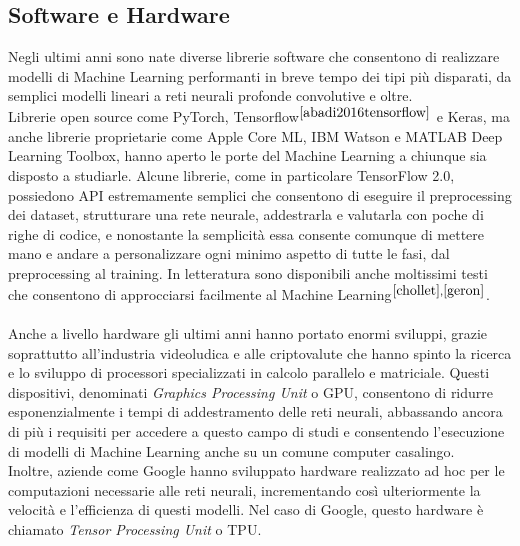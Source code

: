 \subsection{Software e Hardware}
Negli ultimi anni sono nate diverse librerie software che consentono di realizzare modelli di Machine Learning performanti in breve tempo dei tipi più disparati, da semplici modelli lineari a reti neurali profonde convolutive e oltre.\\
Librerie open source come PyTorch, Tensorflow$^{\cite{abadi2016tensorflow}}$ e Keras, ma anche librerie proprietarie come Apple Core ML, IBM Watson e MATLAB Deep Learning Toolbox, hanno aperto le porte del Machine Learning a chiunque sia disposto a studiarle. Alcune librerie, come in particolare TensorFlow 2.0, possiedono API estremamente semplici che consentono di eseguire il preprocessing dei dataset, strutturare una rete neurale, addestrarla e valutarla con poche di righe di codice, e nonostante la semplicità essa consente comunque di mettere mano e andare a personalizzare ogni minimo aspetto di tutte le fasi, dal preprocessing al training. In letteratura sono disponibili anche moltissimi testi che consentono di approcciarsi facilmente al Machine Learning$^{\cite{chollet},\cite{geron}}$.\\\\
Anche a livello hardware gli ultimi anni hanno portato enormi sviluppi, grazie soprattutto all'industria videoludica e alle criptovalute che hanno spinto la ricerca e lo sviluppo di processori specializzati in calcolo parallelo e matriciale. Questi dispositivi, denominati \textit{Graphics Processing Unit} o GPU, consentono di ridurre esponenzialmente i tempi di addestramento delle reti neurali, abbassando ancora di più i requisiti per accedere a questo campo di studi e consentendo l'esecuzione di modelli di Machine Learning anche su un comune computer casalingo.\\
Inoltre, aziende come Google hanno sviluppato hardware realizzato ad hoc per le computazioni necessarie alle reti neurali, incrementando così ulteriormente la velocità e l'efficienza di questi modelli. Nel caso di Google, questo hardware è chiamato \textit{Tensor Processing Unit} o TPU.
